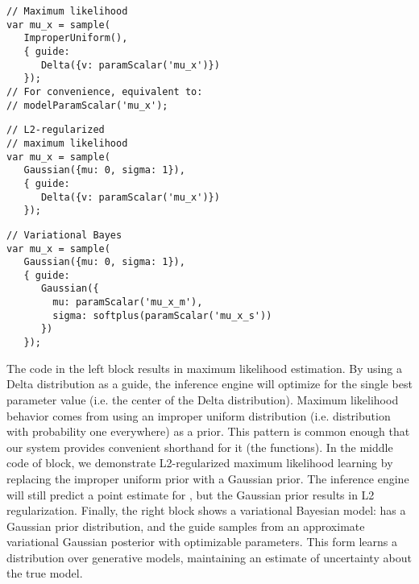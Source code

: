 \begin{minipage}{0.33\linewidth}
\begin{lstlisting}[style=learnableModels]
// Maximum likelihood
var mu_x = sample(
   ImproperUniform(),
   { guide:
      Delta({v: paramScalar('mu_x')})
   });
// For convenience, equivalent to:
// modelParamScalar('mu_x');
\end{lstlisting}
\end{minipage}
%
\hspace{-1em}
%
\begin{minipage}{0.33\linewidth}
\begin{lstlisting}[style=learnableModels]
// L2-regularized
// maximum likelihood
var mu_x = sample(
   Gaussian({mu: 0, sigma: 1}),
   { guide:
      Delta({v: paramScalar('mu_x')})
   });
\end{lstlisting}
\end{minipage}
%
\hspace{-1em}
%
\begin{minipage}{0.33\linewidth}
\begin{lstlisting}[style=learnableModels]
// Variational Bayes
var mu_x = sample(
   Gaussian({mu: 0, sigma: 1}),
   { guide:
      Gaussian({
        mu: paramScalar('mu_x_m'),
        sigma: softplus(paramScalar('mu_x_s'))
      })
   });
\end{lstlisting}
\end{minipage}

The code in the left block results in maximum likelihood estimation. By using a Delta distribution as a guide, the inference engine will optimize for the single best parameter value (i.e. the center of the Delta distribution). Maximum likelihood behavior comes from using an improper uniform distribution (i.e. distribution with probability one everywhere) as a prior. This pattern is common enough that our system provides convenient shorthand for it (the  functions).
In the middle code of block, we demonstrate L2-regularized maximum likelihood learning by replacing the improper uniform prior with a Gaussian prior. The inference engine will still predict a point estimate for , but the Gaussian prior results in L2 regularization.
Finally, the right block shows a variational Bayesian model:  has a Gaussian prior distribution, and the guide samples  from an approximate variational Gaussian posterior with optimizable parameters.
This form learns a distribution over generative models, maintaining an estimate of uncertainty about the true model.

